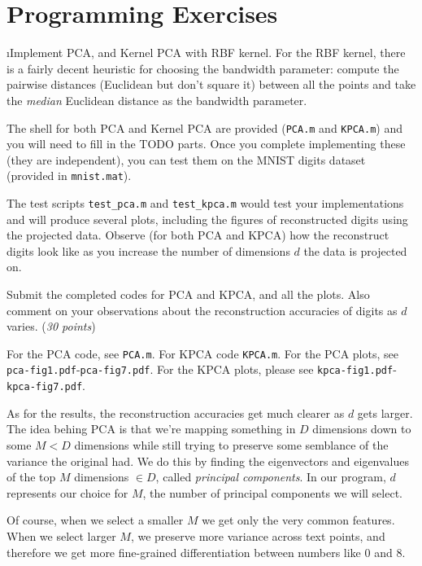 \documentclass[fleqn]{article}
\begin{document}
\ene

\section{Programming Exercises}

\bee

\i Implement PCA, and Kernel PCA with RBF kernel. For the RBF kernel,
there is a fairly decent heuristic for choosing the bandwidth parameter: 
compute the pairwise distances (Euclidean but don't square it) between all 
the points and take the \emph{median} Euclidean distance as the bandwidth
parameter. 

The shell for both PCA and Kernel PCA are provided ({\tt PCA.m} and 
{\tt KPCA.m}) and you will need to fill in the TODO parts. 
Once you complete implementing these (they are independent), you can test them
on the MNIST digits dataset (provided in {\tt mnist.mat}).

The test scripts {\tt test\_pca.m} and {\tt test\_kpca.m} would test your
implementations and will produce several plots, including the figures of 
reconstructed digits using the projected data. Observe (for both
PCA and KPCA) how the reconstruct digits look like as you increase 
the number of dimensions $d$ the data is projected on.

Submit the completed codes for PCA and KPCA, and all the plots. Also comment on your
observations about the reconstruction accuracies of digits as $d$ varies.
(\emph{30 points})

\begin{solution}
For the PCA code, see \texttt{PCA.m}. For KPCA code \texttt{KPCA.m}. For the PCA plots, see \texttt{pca-fig1.pdf}-\texttt{pca-fig7.pdf}. For the KPCA plots, please see \texttt{kpca-fig1.pdf}-\texttt{kpca-fig7.pdf}. \newline

As for the results, the reconstruction accuracies get much clearer as $d$ gets larger. The idea behing PCA is that we're mapping something in $D$ dimensions down to some $M < D$ dimensions while still trying to preserve some semblance of the variance the original had. We do this by finding the eigenvectors and eigenvalues of the top $M$ dimensions $\in D$, called \textit{principal components}. In our program, $d$ represents our choice for $M$, the number of principal components we will select. \newline

Of course, when we select a smaller $M$ we get only the very common features. When we select larger $M$, we preserve more variance across text points, and therefore we get more fine-grained differentiation between numbers like 0 and 8.
\end{solution}
\end{document}

